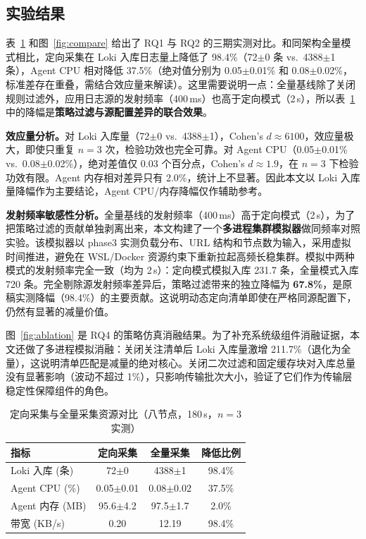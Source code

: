 \subsection{实验结果}
表~\ref{tab:compare} 和图~\ref{fig:compare} 给出了 RQ1 与 RQ2 的三期实测对比。和同架构全量模式相比，定向采集在 Loki 入库日志量上降低了 98.4\%（72$\pm$0 条 vs.\ 4388$\pm$1 条），Agent CPU 相对降低 37.5\%（绝对值分别为 0.05$\pm$0.01\% 和 0.08$\pm$0.02\%，标准差存在重叠，需结合效应量来解读）。这里需要说明一点：全量基线除了关闭规则过滤外，应用日志源的发射频率（400\,ms）也高于定向模式（2\,s），所以表~\ref{tab:compare} 中的降幅是\textbf{策略过滤与源配置差异的联合效果}。

\textbf{效应量分析。}对 Loki 入库量（72$\pm$0 vs.\ 4388$\pm$1），Cohen's $d{\approx}6100$，效应量极大，即使只重复 $n{=}3$ 次，检验功效也完全可靠。对 Agent CPU（0.05$\pm$0.01\% vs.\ 0.08$\pm$0.02\%），绝对差值仅 0.03 个百分点，Cohen's $d{\approx}1.9$，在 $n{=}3$ 下检验功效有限。Agent 内存相对差异只有 2.0\%，统计上不显著。因此本文以 Loki 入库量降幅作为主要结论，Agent CPU/内存降幅仅作辅助参考。

\textbf{发射频率敏感性分析。}全量基线的发射频率（400\,ms）高于定向模式（2\,s），为了把策略过滤的贡献单独剥离出来，本文构建了一个\textbf{多进程集群模拟器}做同频率对照实验。该模拟器以 phase3 实测负载分布、URL 结构和节点数为输入，采用虚拟时间推进，避免在 WSL/Docker 资源约束下重新拉起高频长稳集群。模拟中两种模式的发射频率完全一致（均为 2\,s）：定向模式模拟入库 231.7 条，全量模式入库 720 条。完全剔除源发射频率差异后，策略过滤带来的独立降幅为 \textbf{67.8\%}，是原稿实测降幅（98.4\%）的主要贡献。这说明动态定向清单即使在严格同源配置下，仍然有显著的减量价值。

图~\ref{fig:ablation} 是 RQ4 的策略仿真消融结果。为了补充系统级组件消融证据，本文还做了多进程模拟消融：关闭关注清单后 Loki 入库量激增 211.7\%（退化为全量），这说明清单匹配是减量的绝对核心。关闭二次过滤和固定缓存块对入库总量没有显著影响（波动不超过 1\%），只影响传输批次大小，验证了它们作为传输层稳定性保障组件的角色。

\begin{table}[htbp]
  \centering
  \caption{定向采集与全量采集资源对比（八节点，180\,s，$n{=}3$ 实测）}
  \label{tab:compare}
  \begin{tabular}{lccc}
    \toprule
    指标 & 定向采集 & 全量采集 & 降低比例 \\
    \midrule
    Loki 入库 (条) & 72$\pm$0 & 4388$\pm$1 & 98.4\% \\
    Agent CPU (\%) & 0.05$\pm$0.01 & 0.08$\pm$0.02 & 37.5\% \\
    Agent 内存 (MB) & 95.6$\pm$4.2 & 97.5$\pm$1.7 & 2.0\% \\
    带宽 (KB/s) & 0.20 & 12.19 & 98.4\% \\
    \bottomrule
  \end{tabular}
\end{table}

